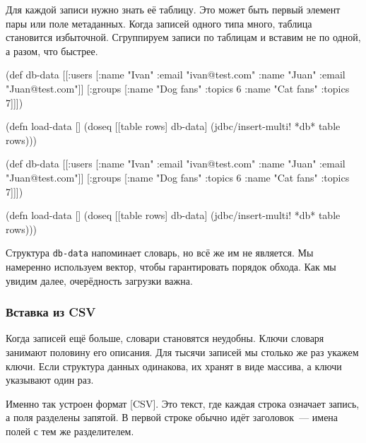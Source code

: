 Для каждой записи нужно знать её таблицу. Это может быть первый элемент пары
 или поле метаданных. Когда записей одного типа много,
таблица становится избыточной. Сгруппируем записи по таблицам и вставим не по
одной, а разом, что быстрее.


\ifx\DEVICETYPE\MOBILE

\begin{english}
  \begin{clojure}
(def db-data
  [[:users [{:name "Ivan"
             :email "ivan@test.com"}
            {:name "Juan"
             :email "Juan@test.com"}]]
  [:groups [{:name "Dog fans"
             :topics 6}
            {:name "Cat fans"
             :topics 7}]]])

(defn load-data []
 (doseq [[table rows] db-data]
  (jdbc/insert-multi! *db* table rows)))
  \end{clojure}
\end{english}

\else

\begin{english}
  \begin{clojure}
(def db-data
  [[:users [{:name "Ivan" :email "ivan@test.com"}
            {:name "Juan" :email "Juan@test.com"}]]
   [:groups [{:name "Dog fans" :topics 6}
             {:name "Cat fans" :topics 7}]]])

(defn load-data []
  (doseq [[table rows] db-data]
    (jdbc/insert-multi! *db* table rows)))
  \end{clojure}
\end{english}

\fi

Структура \verb|db-data| напоминает словарь, но всё же им не является. Мы
намеренно используем вектор, чтобы гарантировать порядок обхода. Как мы увидим
далее, очерёдность загрузки важна.

\subsubsection*{Вставка из CSV}


Когда записей ещё больше, словари становятся неудобны. Ключи словаря занимают
половину его описания. Для тысячи записей мы столько же раз укажем ключи. Если
структура данных одинакова, их хранят в виде массива, а ключи указывают один
раз.

Именно так устроен формат [CSV].
Это текст, где каждая строка означает запись, а поля разделены запятой.
В первой строке обычно идёт заголовок~--- имена полей с тем же разделителем.

